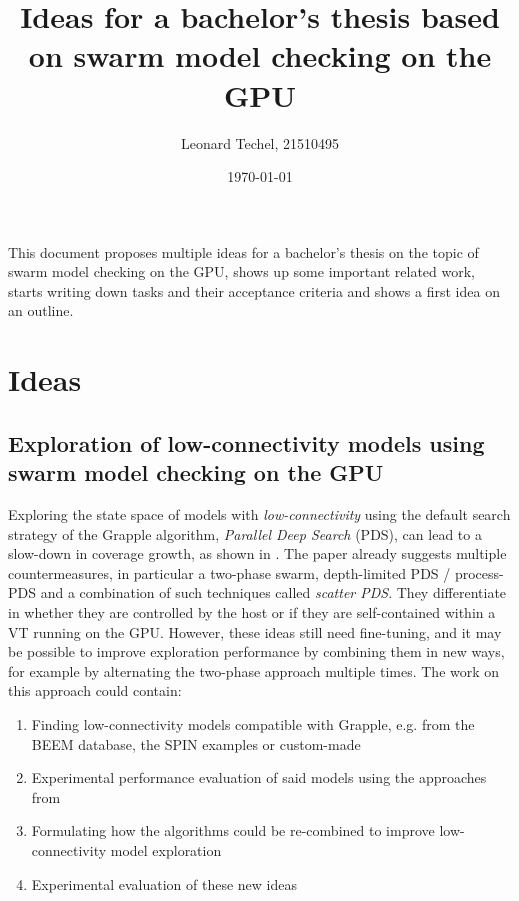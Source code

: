 \documentclass[a4paper]{scrartcl}
\title{Ideas for a bachelor's thesis based on swarm model checking on the GPU}
\author{Leonard Techel, 21510495}
\date{\today}
\begin{document}
\maketitle

This document proposes multiple ideas for a bachelor's thesis on the topic of swarm model checking on the GPU, shows up some important related work, starts writing down tasks and their acceptance criteria and shows a first idea on an outline.

\section{Ideas}


\subsection{Exploration of low-connectivity models using swarm model checking on the GPU}

Exploring the state space of models with \emph{low-connectivity} using the default search strategy of the Grapple algorithm, \emph{Parallel Deep Search} (PDS), can lead to a slow-down in coverage growth, as shown in \cite{DeFrancisco2020.Grapple}. The paper already suggests multiple countermeasures, in particular a two-phase swarm, depth-limited PDS / process-PDS and a combination of such techniques called \emph{scatter PDS}. They differentiate in whether they are controlled by the host or if they are self-contained within a VT running on the GPU. However, these ideas still need fine-tuning, and it may be possible to improve exploration performance by combining them in new ways, for example by alternating the two-phase approach multiple times. The work on this approach could contain:

\begin{enumerate}
    \item Finding low-connectivity models compatible with Grapple, e.g. from the BEEM database, the SPIN examples or custom-made
    \item Experimental performance evaluation of said models using the approaches from \cite{DeFrancisco2020.Grapple}
    \item Formulating how the algorithms could be re-combined to improve low-connectivity model exploration
    \item Experimental evaluation of these new ideas
\end{enumerate}
\end{document}
